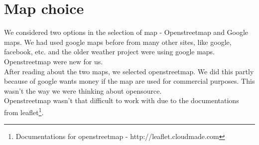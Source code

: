 \chapter{Map choice}
We considered two options in the selection of map - Openstreetmap and Google maps. We had used google maps before from many other sites, like google, facebook, etc. and the older weather project were using google maps. Openstreetmap were new for us.\\
After reading about the two maps, we selected openstreetmap. We did this partly because of google wants money if the map are used for commercial purposes. This wasn't the way we were thinking about opensource.\\
Openstreetmap wasn't that difficult to work with due to the documentations from leaflet\footnote{Documentations for openstreetmap - http://leaflet.cloudmade.com}.